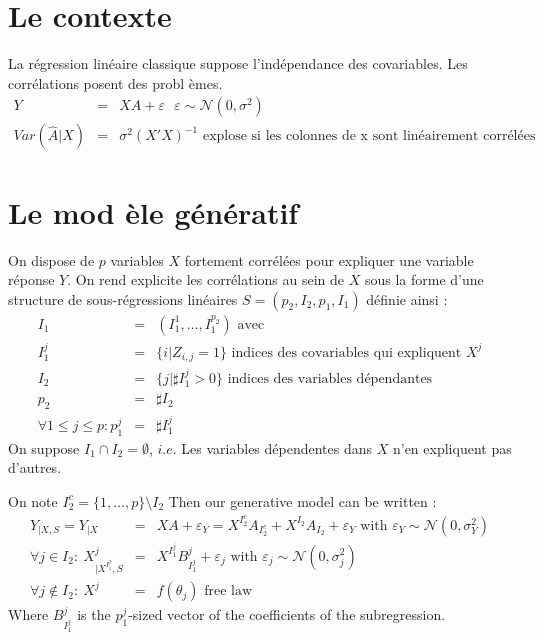 \documentclass[12pt]{article}
\begin{document}

\section{Le contexte}
	La régression linéaire classique suppose l'indépendance des covariables. Les corr\'elations posent des probl \`emes.
	\begin{eqnarray}
		Y&=&XA+\varepsilon \ \ \ \varepsilon\sim \mathcal{N}(0,\sigma^2) \\
		Var(\hat{A}|X)&=& \sigma^2(X'X)^{-1} \textrm{ explose si les colonnes de x sont lin\'eairement corr\'el\'ees}
	\end{eqnarray}
			
	
	
\section{Le mod \`ele g\'en\'eratif}
On dispose de $p$ variables $X$ fortement corrélées pour expliquer une variable réponse $Y$.
On rend explicite les corrélations au sein de $X$ sous la forme d'une structure de sous-régressions linéaires $S=(p_2,I_2,p_1,I_1)$ définie ainsi :
	\begin{eqnarray}
		I_1&=&(I_1^1,\dots,I_1^{p_2}) \textrm{ avec}		\\
		I_1^j &=& \{i |Z_{i,j}=1 \} \textrm{ indices des covariables qui expliquent $X^j$} \\
		I_2&=&\{j |\sharp I_1^j>0 \}  \textrm{ indices des variables dépendantes} \\
		p_2&=& \sharp I_2 \\
		\forall 1\leq j\leq p :  p_1^j&=&\sharp I_1^j
	\end{eqnarray}
	On suppose $I_1\cap I_2=\emptyset$, $i.e.$ Les variables dépendentes dans $X$ n'en expliquent pas d'autres. 
	
	On note $I_2^c=\{1,\dots,p\}\setminus I_2$
Then our generative model can be written :
\begin{eqnarray}
	Y_{|X,S}=Y_{|X}&=&XA+\varepsilon_Y= X^{I_2^c}A_{I_2^c}+X^{I_2}A_{I_2}+\varepsilon_Y \textrm{ with } \varepsilon_Y \sim \mathcal{N}(0,\sigma_Y^2) \label{MainR}\\
	\forall j \in I_2 : \  X^j_{|X^{I_1^j},S}&=&X^{I_1^j}B_{I_1^j}^j + \varepsilon_{j} \textrm{ with } \varepsilon_j \sim \mathcal{N}(0,\sigma_j^2) \label{SR}\\
    \forall j \notin I_2 : \ X^j &=& f(\theta_j) \textrm{ free law}	
\end{eqnarray}
Where $B_{I_1^j}^j$ is the $p_1^j$-sized vector of the coefficients of the subregression.
\end{document}
